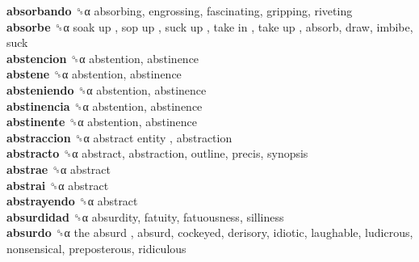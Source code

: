 \textbf{absorbando} ␝α  absorbing, engrossing, fascinating, gripping, riveting  \\
\textbf{absorbe} ␝α   soak up ,  sop up ,  suck up ,  take in ,  take up , absorb, draw, imbibe, suck  \\
\textbf{abstencion} ␝α  abstention, abstinence  \\
\textbf{abstene} ␝α  abstention, abstinence  \\
\textbf{absteniendo} ␝α  abstention, abstinence  \\
\textbf{abstinencia} ␝α  abstention, abstinence  \\
\textbf{abstinente} ␝α  abstention, abstinence  \\
\textbf{abstraccion} ␝α   abstract entity , abstraction  \\
\textbf{abstracto} ␝α  abstract, abstraction, outline, precis, synopsis  \\
\textbf{abstrae} ␝α  abstract  \\
\textbf{abstrai} ␝α  abstract  \\
\textbf{abstrayendo} ␝α  abstract  \\
\textbf{absurdidad} ␝α  absurdity, fatuity, fatuousness, silliness  \\
\textbf{absurdo} ␝α   the absurd , absurd, cockeyed, derisory, idiotic, laughable, ludicrous, nonsensical, preposterous, ridiculous  \\
